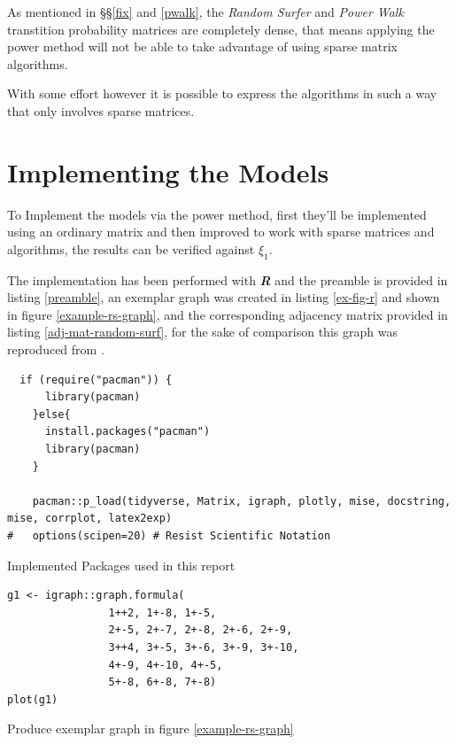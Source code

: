 \documentclass[11pt]{article}
\begin{document}
As mentioned in \S\S \ref{fix} and \ref{pwalk}, the \emph{Random Surfer} and \emph{Power Walk}
transtition probability matrices are completely dense, that means applying the
power method will not be able to take advantage of using sparse matrix
algorithms.

With some effort however it is possible to express the algorithms in such a way that only involves sparse matrices.

\section{Implementing the Models}
\label{implement_models}
To Implement the models via the power method, first they'll be implemented using
an ordinary matrix and then improved to work with sparse matrices and
algorithms, the results can be verified against \(\xi_{1}\).

The implementation has been performed with \emph{\textbf{R}} and the preamble is
provided in listing \ref{preamble}, an exemplar graph was created in listing \ref{ex-fig-r} and shown in figure \ref{example-rs-graph}, and the corresponding adjacency matrix provided in listing \ref{adj-mat-random-surf}, for the sake of comparison this graph was reproduced from \cite{parkPowerWalkRevisiting2013}.




\begin{listing}[htbp]
\begin{verbatim}
  if (require("pacman")) {
      library(pacman)
    }else{
      install.packages("pacman")
      library(pacman)
    }

    pacman::p_load(tidyverse, Matrix, igraph, plotly, mise, docstring, mise, corrplot, latex2exp)
#   options(scipen=20) # Resist Scientific Notation
\end{verbatim}
\caption{\label{preamble}Implemented Packages used in this report}
\end{listing}


\begin{listing}[htbp]
\begin{verbatim}
g1 <- igraph::graph.formula(
                1++2, 1+-8, 1+-5,
                2+-5, 2+-7, 2+-8, 2+-6, 2+-9,
                3++4, 3+-5, 3+-6, 3+-9, 3+-10,
                4+-9, 4+-10, 4+-5,
                5+-8, 6+-8, 7+-8)
plot(g1)
\end{verbatim}
\caption{\label{ex-fig-r}Produce exemplar graph in figure \ref{example-rs-graph}}
\end{listing}
\end{document}

